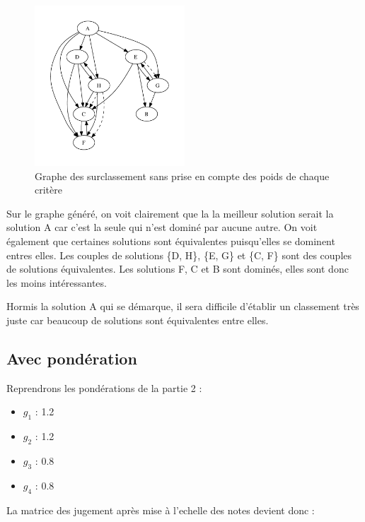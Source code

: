 \clearpage

\begin{figure}[!h]
	\begin{center}
		\includegraphics[width=0.5\textwidth]{../SourcesMatlab/electre3-1.pdf}
		\caption{Graphe des surclassement sans prise en compte des poids de chaque critère}
	\end{center}
\end{figure}

Sur le graphe généré, on voit clairement que la la meilleur solution serait la
solution A car c'est la seule qui n'est dominé par aucune autre.
On voit également que certaines solutions sont équivalentes puisqu'elles se
dominent entres elles. Les couples de solutions \{D, H\}, \{E, G\} et \{C, F\}
sont des couples de solutions équivalentes.
Les solutions F, C et B sont dominés, elles sont donc les moins intéressantes.

Hormis la solution A qui se démarque, il sera difficile d'établir un classement très juste car beaucoup de solutions sont équivalentes entre elles.

\subsection{Avec pondération}
Reprendrons les pondérations de la partie 2 :
\begin{itemize}
	\item $g_1$ : 1.2
	\item $g_2$ : 1.2
	\item $g_3$ : 0.8
	\item $g_4$ : 0.8
\end{itemize}

La matrice des jugement après mise à l'echelle des notes devient donc :

